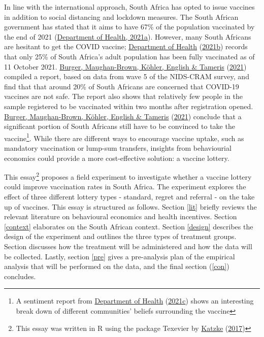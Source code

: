 \documentclass[11pt,preprint, authoryear]{elsarticle}
\numberwithin{equation}{section}
\numberwithin{figure}{section}
\numberwithin{table}{section}
\let\rmarkdownfootnote\footnote%
\def\footnote{\protect\rmarkdownfootnote}
\begin{document}
In line with the international approach, South Africa has opted to issue
vaccines in addition to social distancing and lockdown measures. The
South African government has stated that it aims to have 67\% of the
population vaccinated by the end of 2021
(\protect\hyperlink{ref-herd}{Department of Health, 2021a}). However,
many South Africans are hesitant to get the COVID vaccine;
\protect\hyperlink{ref-stat}{Department of Health}
(\protect\hyperlink{ref-stat}{2021b}) records that only 25\% of South
Africa's adult population has been fully vaccinated as of 11 October
2021. \protect\hyperlink{ref-cram}{Burger, Maughan-Brown, Köhler,
English \& Tameris} (\protect\hyperlink{ref-cram}{2021}) compiled a
report, based on data from wave 5 of the NIDS-CRAM survey, and find that
that around 20\% of South Africans are concerned that COVID-19 vaccines
are not safe. The report also shows that relatively few people in the
sample registered to be vaccinated within two months after registration
opened. \protect\hyperlink{ref-cram}{Burger, Maughan-Brown, Köhler,
English \& Tameris} (\protect\hyperlink{ref-cram}{2021}) conclude that a
significant portion of South Africans still have to be convinced to take
the vaccine\footnote{A sentiment report from
  \protect\hyperlink{ref-report}{Department of Health}
  (\protect\hyperlink{ref-report}{2021c}) shows an interesting break
  down of different communities' beliefs surrounding the vaccine}. While
there are different ways to encourage vaccine uptake, such as mandatory
vaccination or lump-sum transfers, insights from behaviourial economics
could provide a more cost-effective solution: a vaccine lottery.

This essay\footnote{This essay was written in R using the package
  Texevier by \protect\hyperlink{ref-Texevier}{Katzke}
  (\protect\hyperlink{ref-Texevier}{2017})} proposes a field experiment
to investigate whether a vaccine lottery could improve vaccination rates
in South Africa. The experiment explores the effect of three different
lottery types - standard, regret and referral - on the take up of
vaccines. This essay is structured as follows. Section \ref{lit} briefly
reviews the relevant literature on behavioural economics and health
incentives. Section \ref{context} elaborates on the South African
context. Section \ref{design} describes the design of the experiment and
outlines the three types of treatment groups. Section \label{treat}
discusses how the treatment will be administered and how the data will
be collected. Lastly, section \ref{pre} gives a pre-analysis plan of the
empirical analysis that will be performed on the data, and the final
section (\ref{con}) concludes.
\end{document}
